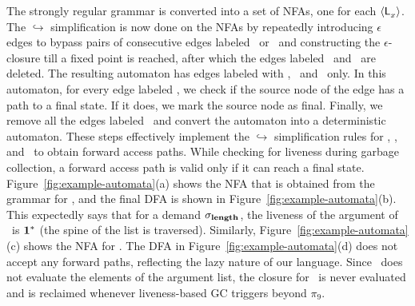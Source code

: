 \documentclass[9pt,preprint,nonatbib]{sigplanconf}
\begin{document}
The strongly regular grammar is converted  into a set of NFAs, one for
each $\langle \mathsf{L}_{{x}}^{}\rangle$.  The  $\hookrightarrow$ simplification is now
done on the NFAs by  repeatedly introducing $\epsilon$ edges to bypass
pairs  of consecutive  edges  labeled \bcar\acar\  or \bcdr\acdr\  and
constructing  the $\epsilon$-closure  till a  fixed point  is reached,
after which  the edges labeled  \bcar \  and \bcdr\ are  deleted.  
The
resulting  automaton   has  edges  labeled  with   \acar,  \acdr\  and
\clazy\ only.  In this  automaton, for every  edge labeled  \clazy, we
check if the source node of the edge has a path to a final 
state.  If it does, we mark  the source node as final. Finally, we
remove all the edges labeled \clazy\  and convert the automaton into a
deterministic    automaton.    These steps   effectively   implement    the
$\hookrightarrow$   simplification  rules   for   \bcar,  \bcdr,   and
\clazy\ to  obtain forward access paths.  While checking for  liveness during
garbage  collection, a  forward access path  is valid  only if  it can
reach a  final state.  Figure~\ref{fig:example-automata}(a)  shows the
NFA that is obtained from  the grammar for , and   the
final  DFA  is  shown in  Figure~\ref{fig:example-automata}(b).   This
expectedly  says that for a  demand  $\sigma_{\mathbf{length}}$,  the
liveness of  the argument of \length\  is $\mathbf{1}^{*}$  (the spine  of the  list is
traversed).  Similarly, Figure~\ref{fig:example-automata}(c) shows the
NFA     for     \var{\Lanv{\pa}{}}.      The     DFA in
Figure~\ref{fig:example-automata}(d)  does  not   accept  any  forward
paths, reflecting  the  lazy  nature  of  our  language.   Since
\length\ does not  evaluate the elements of  the argument list,
the  closure for  \pa\ is  never evaluated  and is  reclaimed whenever
liveness-based GC triggers beyond $\pi_9$.

  \SetStartEndCondition{ }{}{}%
  \AlgoDontDisplayBlockMarkers\SetAlgoNoEnd\SetAlgoNoLine%
\end{document}
